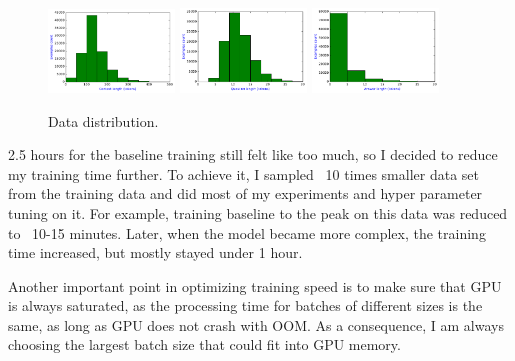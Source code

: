 \documentclass{article}
\begin{document}
\begin{figure} %
    \centering
    \includegraphics[width=0.3\textwidth]{context}
    \includegraphics[width=0.3\textwidth]{question}
    \includegraphics[width=0.3\textwidth]{answer}
    \captionsetup{format=plain, font=footnotesize, labelfont=bf}
    \caption{Data distribution.}
\end{figure}

2.5 hours for the baseline training still felt like too much, so I decided to reduce my training time further. To achieve it, I sampled ~10 times smaller data set from the training data and did most of my experiments and hyper parameter tuning on it. For example, training baseline to the peak on this data was reduced to ~10-15 minutes. Later, when the model became more complex, the training time increased, but mostly stayed under 1 hour.

Another important point in optimizing training speed is to make sure that GPU is always saturated, as the processing time for batches of different sizes is the same, as long as GPU does not crash with OOM. As a consequence, I am always choosing the largest batch size that could fit into GPU memory.

\end{document}
